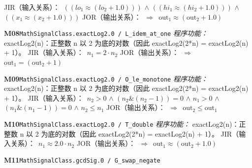 \documentclass[11pt]{article}
\begin{document}
\hspace*{1.5em}JIR（输入关系）：\ $((lo_{1} \approx  (lo_{2} + 1.0)))$ $\wedge$ $((hi_{1} \approx  (hi_{2} + 1.0)))$ $\wedge$ $((x_{1} \approx  (x_{2} + 1.0)))$\newline
\hspace*{1.5em}JOR（输出关系）：\ $\Rightarrow$\ $\mathrm{out}_{1} \approx  (\mathrm{out}_{2} + 1.0)$\par\medskip
\textbf{M08}\quad \texttt{MathSignalClass.exactLog2.0 / L\_idem\_at\_one}\newline
\hspace*{1.5em}\emph{程序功能：} exactLog2(n)：正整数 n 以 2 为底的对数（因此 exactLog2(2*n) = exactLog2(n) + 1）。\newline
\hspace*{1.5em}JIR（输入关系）：\ $n_{1} = 2\cdot n_{2}$\newline
\hspace*{1.5em}JOR（输出关系）：\ $\Rightarrow$\ $\mathrm{out}_{1} = (\mathrm{out}_{2} + 1)$\par\medskip
\textbf{M09}\quad \texttt{MathSignalClass.exactLog2.0 / O\_le\_monotone}\newline
\hspace*{1.5em}\emph{程序功能：} exactLog2(n)：正整数 n 以 2 为底的对数（因此 exactLog2(2*n) = exactLog2(n) + 1）。\newline
\hspace*{1.5em}JIR（输入关系）：\ $n_{2} > 0$ $\wedge$ $(n_{2} \mathbin{\&} (n_{2} - 1)) = 0$ $\wedge$ $n_{1} > 0$ $\wedge$ $(n_{1} \mathbin{\&} (n_{1} - 1)) = 0$ $\wedge$ $n_{2}\leq n_{1}$\newline
\hspace*{1.5em}JOR（输出关系）：\ $\Rightarrow$\ $\mathrm{out}_{2}\leq \mathrm{out}_{1}$\par\medskip
\textbf{M10}\quad \texttt{MathSignalClass.exactLog2.0 / T\_double}\newline
\hspace*{1.5em}\emph{程序功能：} exactLog2(n)：正整数 n 以 2 为底的对数（因此 exactLog2(2*n) = exactLog2(n) + 1）。\newline
\hspace*{1.5em}JIR（输入关系）：\ $n_{1} \approx  2.0\cdot n_{2}$\newline
\hspace*{1.5em}JOR（输出关系）：\ $\Rightarrow$\ $\mathrm{out}_{1} \approx  (\mathrm{out}_{2} + 1.0)$\par\medskip
\textbf{M11}\quad \texttt{MathSignalClass.gcdSig.0 / G\_swap\_negate}\newline
\end{document}
